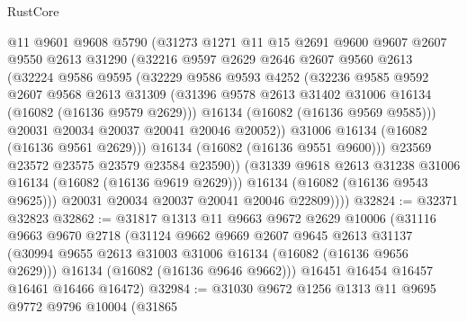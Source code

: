 \begin{lexlean}{RustCore}
\begin{coremodule}
                  @11
                  @9601
                  @9608
                  @5790
                  (@31273
                    @1271
                    @11
                    @15
                    @2691
                    @9600
                    @9607
                    @2607
                    @9550
                    @2613
                    @31290
                    (@32216
                      @9597
                      @2629
                      @2646
                      @2607
                      @9560
                      @2613
                      (@32224
                        @9586
                        @9595
                        (@32229
                          @9586
                          @9593
                          @4252
                          (@32236
                            @9585
                            @9592
                            @2607
                            @9568
                            @2613
                            @31309
                            (@31396 @9578 @2613 @31402 @31006 @16134 (@16082 (@16136 @9579 @2629)))
                            @16134
                            (@16082 (@16136 @9569 @9585)))
                          @20031
                          @20034
                          @20037
                          @20041
                          @20046
                          @20052))
                      @31006
                      @16134
                      (@16082 (@16136 @9561 @2629)))
                    @16134
                    (@16082 (@16136 @9551 @9600)))
                  @23569
                  @23572
                  @23575
                  @23579
                  @23584
                  @23590))
              (@31339 @9618 @2613 @31238 @31006 @16134 (@16082 (@16136 @9619 @2629)))
              @16134
              (@16082 (@16136 @9543 @9625)))
            @20031
            @20034
            @20037
            @20041
            @20046
            @22809))))
@32824 := @32371 @32823
@32862 := @31817
    @1313
    @11
    @9663
    @9672
    @2629
    @10006
    (@31116
      @9663
      @9670
      @2718
      (@31124
        @9662
        @9669
        @2607
        @9645
        @2613
        @31137
        (@30994 @9655 @2613 @31003 @31006 @16134 (@16082 (@16136 @9656 @2629)))
        @16134
        (@16082 (@16136 @9646 @9662)))
      @16451
      @16454
      @16457
      @16461
      @16466
      @16472)
@32984 := @31030
    @9672
    @1256
    @1313
    @11
    @9695
    @9772
    @9796
    @10004
    (@31865

\end{coremodule}
\end{lexlean}
